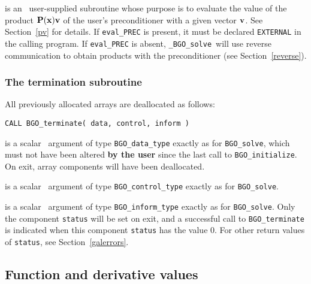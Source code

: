 \documentclass{galahad}
\newcommand{\packagename}{BGO}
\newcommand{\fullpackagename}{\libraryname\_\packagename}
\newcommand{\solver}{{\tt \fullpackagename\_solve}}
\begin{document}
\begin{description}
 is an \optional\
user-supplied subroutine whose purpose is to evaluate the value of the
product ${\mathbf{P}}({\mathbf{x}}){\mathbf{v}}$ of the user's preconditioner with a given vector
${\mathbf{v}}$. See Section~\ref{pv} for details.
If {\tt eval\_PREC} is present,
it must be declared {\tt EXTERNAL} in the calling program.
If {\tt eval\_PREC} is absent, \solver\ will use reverse communication to
obtain products with the preconditioner (see Section~\ref{reverse}).

\end{description}


\subsubsection{The  termination subroutine}
All previously allocated arrays are deallocated as follows:
\vspace*{1mm}

\hspace{8mm}
{\tt CALL \packagename\_terminate( data, control, inform )}

\vspace*{-1mm}
\begin{description}

 is a scalar \intentinout\ argument of type
{\tt \packagename\_data\_type}
exactly as for
{\tt \packagename\_solve},
which must not have been altered {\bf by the user} since the last call to
{\tt \packagename\_initialize}.
On exit, array components will have been deallocated.

 is a scalar \intentin\ argument of type
{\tt \packagename\_control\_type}
exactly as for
{\tt \packagename\_solve}.

 is a scalar \intentout\ argument of type
{\tt \packagename\_inform\_type}
exactly as for
{\tt \packagename\_solve}.
Only the component {\tt status} will be set on exit, and a
successful call to
{\tt \packagename\_terminate}
is indicated when this  component {\tt status} has the value 0.
For other return values of {\tt status}, see Section~\ref{galerrors}.

\end{description}


\subsection{Function and derivative values\label{fdv}}
\end{document}

